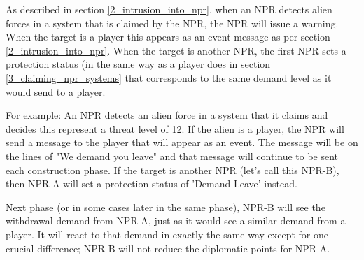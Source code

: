 \documentclass[../Aurora C# unofficial manual.tex]{subfiles}
\begin{document}
	As described in section \ref{2_intrusion_into_npr}, when an NPR detects alien forces in a system that is claimed by the NPR, the NPR will issue a warning. When the target is a player this appears as an event message as per section \ref{2_intrusion_into_npr}. When the target is another NPR, the first NPR sets a protection status (in the same way as a player does in section \ref{3_claiming_npr_systems} that corresponds to the same demand level as it would send to a player.
	
	For example: An NPR detects an alien force in a system that it claims and decides this represent a threat level of 12. If the alien is a player, the NPR will send a message to the player that will appear as an event. The message will be on the lines of "We demand you leave" and that message will continue to be sent each construction phase. If the target is another NPR (let's call this NPR-B), then NPR-A will set a protection status of 'Demand Leave' instead.
	
	Next phase (or in some cases later in the same phase), NPR-B will see the withdrawal demand from NPR-A, just as it would see a similar demand from a player. It will react to that demand in exactly the same way except for one crucial difference; NPR-B will not reduce the diplomatic points for NPR-A.
	
\end{document}
